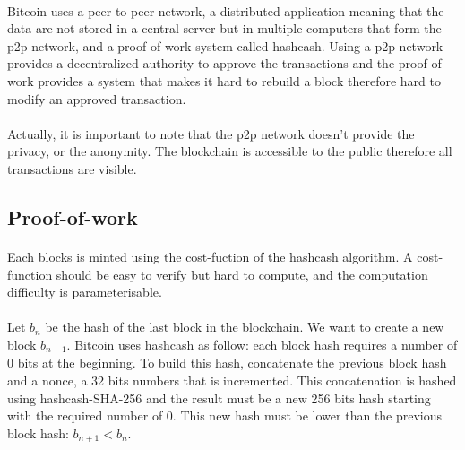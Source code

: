 \documentclass[letterpaper]{article}
\begin{document}
\paragraph{}
Bitcoin uses a peer-to-peer network,
a distributed application meaning that the data are not stored in a
central server but in multiple computers that form the p2p network,
and a proof-of-work system called hashcash\cite{hashcash}. Using a p2p network
provides a decentralized authority to approve the transactions and
the proof-of-work provides a system that makes it hard to rebuild
a block therefore hard to modify an approved transaction.

\paragraph{}
Actually, it is important to note that the p2p network doesn't provide
the privacy, or the anonymity. The blockchain is accessible to the public
therefore all transactions are visible.

\subsection{Proof-of-work}
\label{proof}
\paragraph{}
Each blocks is minted using the cost-fuction of the hashcash
algorithm.
A cost-function should be easy to verify but hard to compute, and the
computation difficulty is parameterisable\cite{hashcash}.
\paragraph{}
Let $b_n$ be the hash
of the last block in the blockchain.
We want to create a new block $b_{n+1}$. Bitcoin uses hashcash as follow:
each block hash requires a number of 0 bits at the beginning. To build this
hash, concatenate the previous block hash and a nonce, a 32 bits numbers
that is incremented. This concatenation is hashed using hashcash-SHA-256
and the result
must be a new 256 bits hash starting with the required number of 0. This new
hash must be lower than the previous block hash: $b_{n+1} < b_n$.



\end{document}
